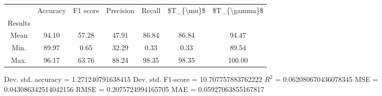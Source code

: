\begin{tabular}{|c|c|c|c|c|c|c|}
\toprule
{} &  Accuracy &  F1 score &  Precision &  Recall &  \$T\_\{\textbackslash mu\}\$ &  \$T\_\{\textbackslash gamma\}\$ \\
Results &           &           &            &         &            &               \\
\hline
Mean    &     94.10 &     57.28 &      47.91 &   86.84 &      86.84 &         94.47 \\
Min.    &     89.97 &      0.65 &      32.29 &    0.33 &       0.33 &         89.54 \\
Max.    &     96.17 &     63.76 &      88.24 &   98.35 &      98.35 &        100.00 \\
\bottomrule
\end{tabular}

 Dev. std. accuracy = 1.271240791638415
 Dev. std. F1-score = 10.707757883762222
 $R^2$ = 0.062080670436078345
 MSE = 0.043086342514042156
 RMSE = 0.2075724994165705
 MAE = 0.05927063855167817
